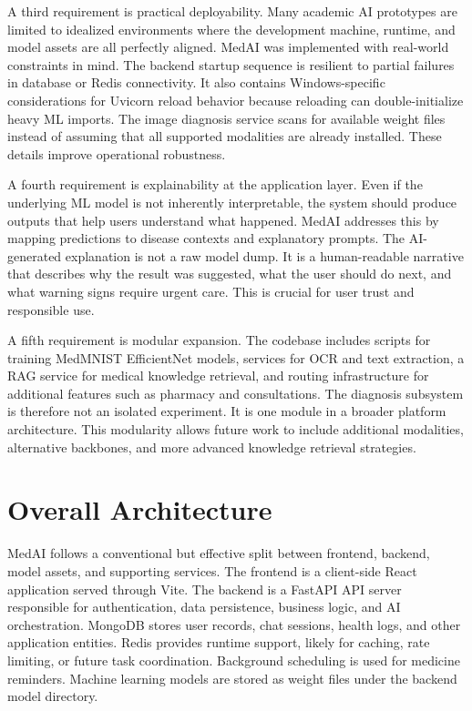 \documentclass[conference]{IEEEtran}
\begin{document}
A third requirement is practical deployability. Many academic AI prototypes are limited to idealized environments where the development machine, runtime, and model assets are all perfectly aligned. MedAI was implemented with real-world constraints in mind. The backend startup sequence is resilient to partial failures in database or Redis connectivity. It also contains Windows-specific considerations for Uvicorn reload behavior because reloading can double-initialize heavy ML imports. The image diagnosis service scans for available weight files instead of assuming that all supported modalities are already installed. These details improve operational robustness.

A fourth requirement is explainability at the application layer. Even if the underlying ML model is not inherently interpretable, the system should produce outputs that help users understand what happened. MedAI addresses this by mapping predictions to disease contexts and explanatory prompts. The AI-generated explanation is not a raw model dump. It is a human-readable narrative that describes why the result was suggested, what the user should do next, and what warning signs require urgent care. This is crucial for user trust and responsible use.

A fifth requirement is modular expansion. The codebase includes scripts for training MedMNIST EfficientNet models, services for OCR and text extraction, a RAG service for medical knowledge retrieval, and routing infrastructure for additional features such as pharmacy and consultations. The diagnosis subsystem is therefore not an isolated experiment. It is one module in a broader platform architecture. This modularity allows future work to include additional modalities, alternative backbones, and more advanced knowledge retrieval strategies.

\section{Overall Architecture}
MedAI follows a conventional but effective split between frontend, backend, model assets, and supporting services. The frontend is a client-side React application served through Vite. The backend is a FastAPI API server responsible for authentication, data persistence, business logic, and AI orchestration. MongoDB stores user records, chat sessions, health logs, and other application entities. Redis provides runtime support, likely for caching, rate limiting, or future task coordination. Background scheduling is used for medicine reminders. Machine learning models are stored as weight files under the backend model directory.
\end{document}
